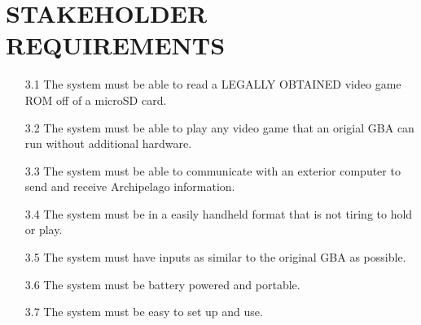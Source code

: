\section{STAKEHOLDER REQUIREMENTS}
\begin{enumerate}
	\item [3.1] The system must be able to read a LEGALLY OBTAINED video game ROM off of a microSD card.
	\item [3.2] The system must be able to play any video game that an origial GBA can run without additional hardware.
	\item [3.3] The system must be able to communicate with an exterior computer to send and receive Archipelago information.
	\item [3.4] The system must be in a easily handheld format that is not tiring to hold or play.
	\item [3.5] The system must have inputs as similar to the original GBA as possible.
	\item [3.6] The system must be battery powered and portable.
	\item [3.7] The system must be easy to set up and use.
\end{enumerate}
